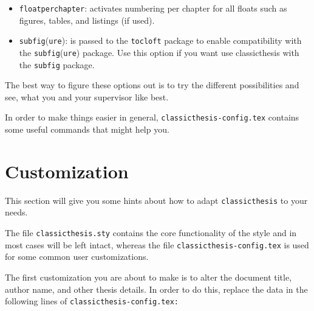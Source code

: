 \begin{itemize}
\begin{itemize}
        \item\texttt{floatperchapter}: activates numbering per chapter for
        all floats such as figures, tables, and listings (if used).

        \item\texttt{subfig}(\texttt{ure}): is passed to the \texttt{tocloft}
        package to enable compatibility with the \texttt{subfig}(\texttt{ure})
        package. Use this option if you want use classicthesis with the
        \texttt{subfig} package.

        \end{itemize}

\end{itemize}
The best way to figure these options out is to try the different
possibilities and see, what you and your supervisor like best.

In order to make things easier in general,
\texttt{classicthesis-config.tex}
contains some useful commands that might help you.


\section{Customization}\label{sec:custom}
This section will give you some hints about how to adapt
\texttt{classicthesis} to your needs.

The file \texttt{classicthesis.sty}
contains the core functionality of the style and in most cases will
be left intact, whereas the file \texttt{classic\-thesis-config.tex}
is used for some common user customizations.

The first customization you are about to make is to alter the document
title, author name, and other thesis details. In order to do this, replace
the data in the following lines of \texttt{classicthesis-config.tex:}%

